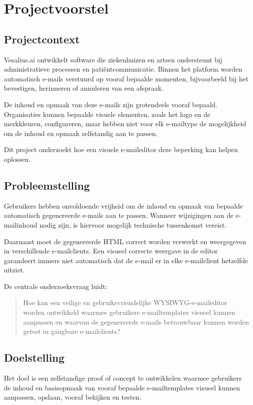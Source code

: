 \chapter{Projectvoorstel}
\label{app:projectvoorstel}

\section{Projectcontext}
Vesalius.ai ontwikkelt software die ziekenhuizen en artsen ondersteunt bij
administratieve processen en patiëntcommunicatie. Binnen het platform worden
automatisch e-mails verstuurd op vooraf bepaalde momenten, bijvoorbeeld bij
het bevestigen, herinneren of annuleren van een afspraak.

De inhoud en opmaak van deze e-mails zijn grotendeels vooraf bepaald.
Organisaties kunnen bepaalde visuele elementen, zoals het logo en de
merkkleuren, configureren, maar hebben niet voor elk e-mailtype de mogelijkheid
om de inhoud en opmaak zelfstandig aan te passen.

Dit project onderzoekt hoe een visuele e-maileditor deze beperking kan helpen
oplossen.

\section{Probleemstelling}
Gebruikers hebben onvoldoende vrijheid om de inhoud en opmaak van bepaalde
automatisch gegenereerde e-mails aan te passen. Wanneer wijzigingen aan de
e-mailinhoud nodig zijn, is hiervoor mogelijk technische tussenkomst vereist.

Daarnaast moet de gegenereerde HTML correct worden verwerkt en weergegeven
in verschillende e-mailclients. Een visueel correcte weergave in de editor
garandeert immers niet automatisch dat de e-mail er in elke e-mailclient
hetzelfde uitziet.

De centrale onderzoeksvraag luidt:

\begin{quote}
Hoe kan een veilige en gebruiksvriendelijke WYSIWYG-e-maileditor worden
ontwikkeld waarmee gebruikers e-mailtemplates visueel kunnen aanpassen en
waarvan de gegenereerde e-mails betrouwbaar kunnen worden getest in gangbare
e-mailclients?
\end{quote}

\section{Doelstelling}
Het doel is een zelfstandige proof of concept te ontwikkelen waarmee
gebruikers de inhoud en basisopmaak van vooraf bepaalde e-mailtemplates
visueel kunnen aanpassen, opslaan, vooraf bekijken en testen.

